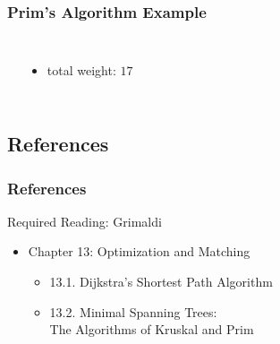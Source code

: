 \documentclass[dvipsnames]{beamer}
\begin{document}
\begin{frame}
  \frametitle{Prim's Algorithm Example}

  \begin{example}[$7 \nless 7$]
    \begin{columns}
      \begin{center}
      \end{center}

      \begin{itemize}
        \item total weight: $17$
      \end{itemize}
    \end{columns}
  \end{example}
\end{frame}


\subsection*{References}

\begin{frame}
  \frametitle{References}

  \begin{block}{Required Reading: Grimaldi}
    \begin{itemize}
      \item Chapter 13: Optimization and Matching
      \begin{itemize}
        \item 13.1. \alert{Dijkstra's Shortest Path Algorithm}
        \item 13.2. \alert{Minimal Spanning Trees:\\
                           The Algorithms of Kruskal and Prim}
      \end{itemize}
    \end{itemize}
  \end{block}
\end{frame}
\end{document}
